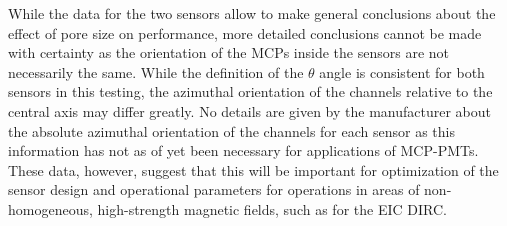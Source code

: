 While the data for the two sensors allow to make general conclusions about the effect of pore size on performance, more detailed conclusions cannot be made with certainty as the orientation of the MCPs inside the sensors are not necessarily the same. While the definition of the $\theta$ angle is consistent for both sensors in this testing, the azimuthal orientation of the channels relative to the central axis may differ greatly. No details are given by the manufacturer about the absolute azimuthal orientation of the channels for each sensor as this information has not as of yet been necessary for applications of MCP-PMTs. These data, however, suggest that this will be important for optimization of the sensor design and operational parameters for operations in areas of non-homogeneous, high-strength magnetic fields, such as for the EIC DIRC.
